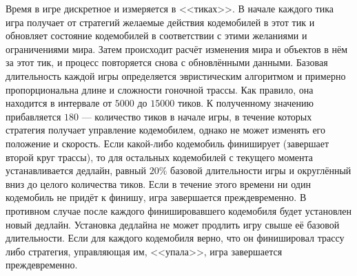 Время в игре дискретное и измеряется в <<тиках>>. В начале каждого тика игра получает от стратегий желаемые действия кодемобилей в этот тик
и обновляет состояние кодемобилей в соответствии с этими желаниями и ограничениями мира. Затем происходит расчёт изменения мира и объектов в
нём за этот тик, и процесс повторяется снова с обновлёнными данными. Базовая длительность каждой игры определяется эвристическим алгоритмом
и примерно пропорциональна длине и сложности гоночной трассы. Как правило, она находится в интервале от $5000$ до $15000$ тиков. К
полученному значению прибавляется $180$ --- количество тиков в начале игры, в течение которых стратегия получает управление кодемобилем,
однако не может изменять его положение и скорость. Если какой-либо кодемобиль финиширует (завершает второй круг трассы), то для остальных
кодемобилей с текущего момента устанавливается дедлайн, равный $20\%$ базовой длительности игры и округлённый вниз до целого количества
тиков. Если в течение этого времени ни один кодемобиль не придёт к финишу, игра завершается преждевременно. В противном случае после каждого
финишировавшего кодемобиля будет установлен новый дедлайн. Установка дедлайна не может продлить игру свыше её базовой длительности. Если для
каждого кодемобиля верно, что он финишировал трассу либо стратегия, управляющая им, <<упала>>, игра завершается преждевременно.

